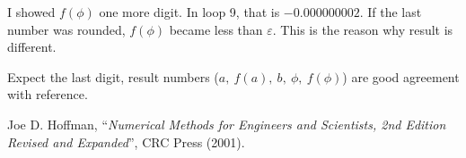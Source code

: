 \documentclass[11pt]{article}
\begin{document}
I showed $f(\phi)$ one more digit. In loop 9, that is $-0.000000002$. If the last number was rounded, $f(\phi)$ became less than $\varepsilon$. This is the reason why result is different.

Expect the last digit, result numbers ($a,\ f(a),\ b,\ \phi,\ f(\phi)$) are good agreement with reference\cite{text}. 
    



\begin{thebibliography}{99}
	 Joe D. Hoffman, ``\textit{Numerical Methods for Engineers and Scientists, 2nd Edition Revised and Expanded}'', CRC Press (2001).
\end{thebibliography}
    
    
    
\end{document}
